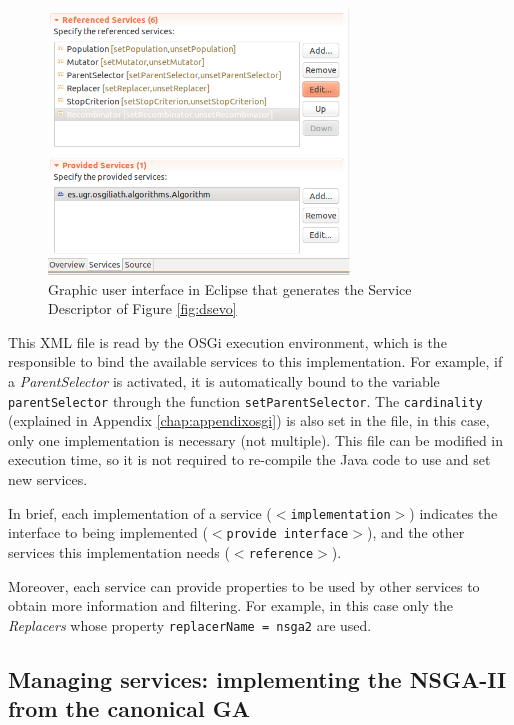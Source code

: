 \begin{figure}
\centering
\includegraphics[width=8cm]{gfx/osgiliath/eclipse.png}

\caption{Graphic user interface in Eclipse that generates the Service Descriptor of Figure \ref{fig:dsevo} }
\label{fig:xmlgui}
\end{figure}



This XML file is read by the OSGi execution environment, which is the
responsible to bind the available services to this implementation. For
example, if a {\em ParentSelector} is activated, it is automatically 
bound to the variable \texttt{ parentSelector} through the function \texttt{setParentSelector}. The \texttt{cardinality} (explained in Appendix \ref{chap:appendixosgi}) is also set in the file,
in this case, only one implementation is necessary (not
multiple). This file can be modified in execution time, so it is not
required to re-compile the Java code to use and set new services. %

In brief, each implementation of a service (\texttt{$<$im\-ple\-men\-ta\-tion$>$}) indicates the interface to being implemented (\texttt{$<$pro\-vi\-de in\-ter\-fa\-ce$>$}), and the other services this implementation needs (\texttt{$<$re\-fe\-ren\-ce$>$}). 

Moreover, each service can provide properties to be used by other
services to obtain more information and filtering. For example, in
this case only the {\em Replacers} whose property \texttt{replacerName = nsga2} are used. 


\subsection{Managing services: implementing the NSGA-II from the canonical GA}


